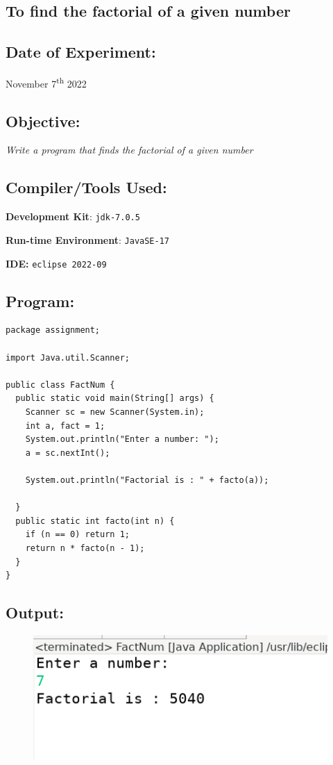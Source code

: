 \documentclass[12pt, a4paper]{article}
\begin{document}
\begin{tcolorbox}
\section{To find the factorial of a given number}
\end{tcolorbox}
\subsection*{Date of Experiment:}
November 7\textsuperscript{th} 2022

\subsection*{Objective:}
\emph{\large{Write a program that finds the factorial of a given number}}

\subsection*{Compiler/Tools Used:}
\textbf{Development Kit}: \verb+jdk-7.0.5+

\textbf{Run-time Environment}: \verb+JavaSE-17+

\textbf{IDE:} \verb+eclipse 2022-09+

\subsection*{Program:}
\begin{lstlisting}
package assignment;

import Java.util.Scanner;

public class FactNum {
  public static void main(String[] args) {
    Scanner sc = new Scanner(System.in);
    int a, fact = 1;
    System.out.println("Enter a number: ");
    a = sc.nextInt();

    System.out.println("Factorial is : " + facto(a));

  }
  public static int facto(int n) {
    if (n == 0) return 1;
    return n * facto(n - 1);
  }
}
\end{lstlisting}
\newpage

\subsection*{Output:}
\begin{figure}[h]
  \centering
  \includegraphics[width=\textwidth]{fact}
\end{figure}
\newpage
\end{document}

